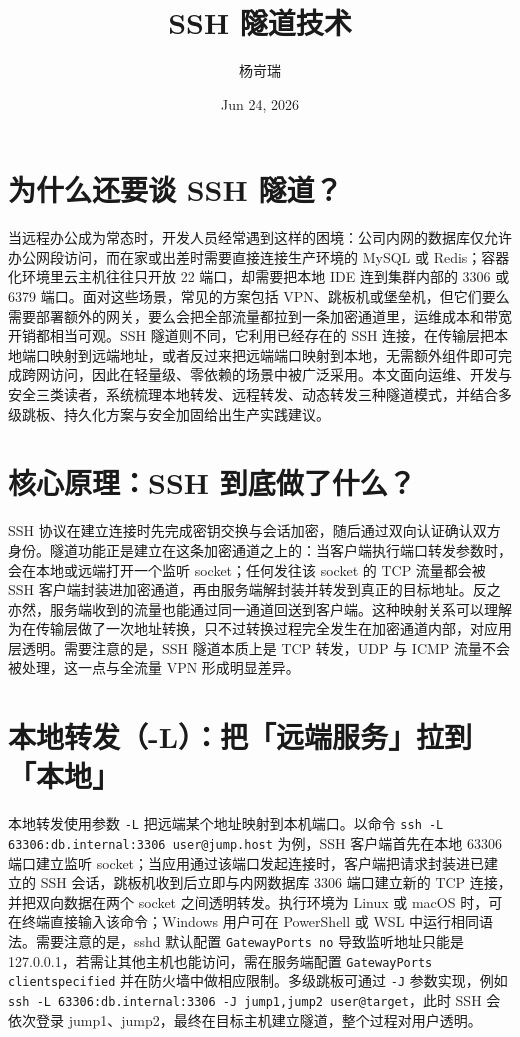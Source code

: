 \title{SSH 隧道技术}
\author{杨岢瑞}
\date{Jun 24, 2026}
\maketitle
\chapter{为什么还要谈 SSH 隧道？}
当远程办公成为常态时，开发人员经常遇到这样的困境：公司内网的数据库仅允许办公网段访问，而在家或出差时需要直接连接生产环境的 MySQL 或 Redis；容器化环境里云主机往往只开放 22 端口，却需要把本地 IDE 连到集群内部的 3306 或 6379 端口。面对这些场景，常见的方案包括 VPN、跳板机或堡垒机，但它们要么需要部署额外的网关，要么会把全部流量都拉到一条加密通道里，运维成本和带宽开销都相当可观。SSH 隧道则不同，它利用已经存在的 SSH 连接，在传输层把本地端口映射到远端地址，或者反过来把远端端口映射到本地，无需额外组件即可完成跨网访问，因此在轻量级、零依赖的场景中被广泛采用。本文面向运维、开发与安全三类读者，系统梳理本地转发、远程转发、动态转发三种隧道模式，并结合多级跳板、持久化方案与安全加固给出生产实践建议。\par
\chapter{核心原理：SSH 到底做了什么？}
SSH 协议在建立连接时先完成密钥交换与会话加密，随后通过双向认证确认双方身份。隧道功能正是建立在这条加密通道之上的：当客户端执行端口转发参数时，会在本地或远端打开一个监听 socket；任何发往该 socket 的 TCP 流量都会被 SSH 客户端封装进加密通道，再由服务端解封装并转发到真正的目标地址。反之亦然，服务端收到的流量也能通过同一通道回送到客户端。这种映射关系可以理解为在传输层做了一次地址转换，只不过转换过程完全发生在加密通道内部，对应用层透明。需要注意的是，SSH 隧道本质上是 TCP 转发，UDP 与 ICMP 流量不会被处理，这一点与全流量 VPN 形成明显差异。\par
\chapter{本地转发（-L）：把「远端服务」拉到「本地」}
本地转发使用参数 \texttt{-L} 把远端某个地址映射到本机端口。以命令 \texttt{ssh -L 63306:db.internal:3306 user@jump.host} 为例，SSH 客户端首先在本地 63306 端口建立监听 socket；当应用通过该端口发起连接时，客户端把请求封装进已建立的 SSH 会话，跳板机收到后立即与内网数据库 3306 端口建立新的 TCP 连接，并把双向数据在两个 socket 之间透明转发。执行环境为 Linux 或 macOS 时，可在终端直接输入该命令；Windows 用户可在 PowerShell 或 WSL 中运行相同语法。需要注意的是，sshd 默认配置 \texttt{GatewayPorts no} 导致监听地址只能是 127.0.0.1，若需让其他主机也能访问，需在服务端配置 \texttt{GatewayPorts clientspecified} 并在防火墙中做相应限制。多级跳板可通过 \texttt{-J} 参数实现，例如 \texttt{ssh -L 63306:db.internal:3306 -J jump1,jump2 user@target}，此时 SSH 会依次登录 jump1、jump2，最终在目标主机建立隧道，整个过程对用户透明。\par
